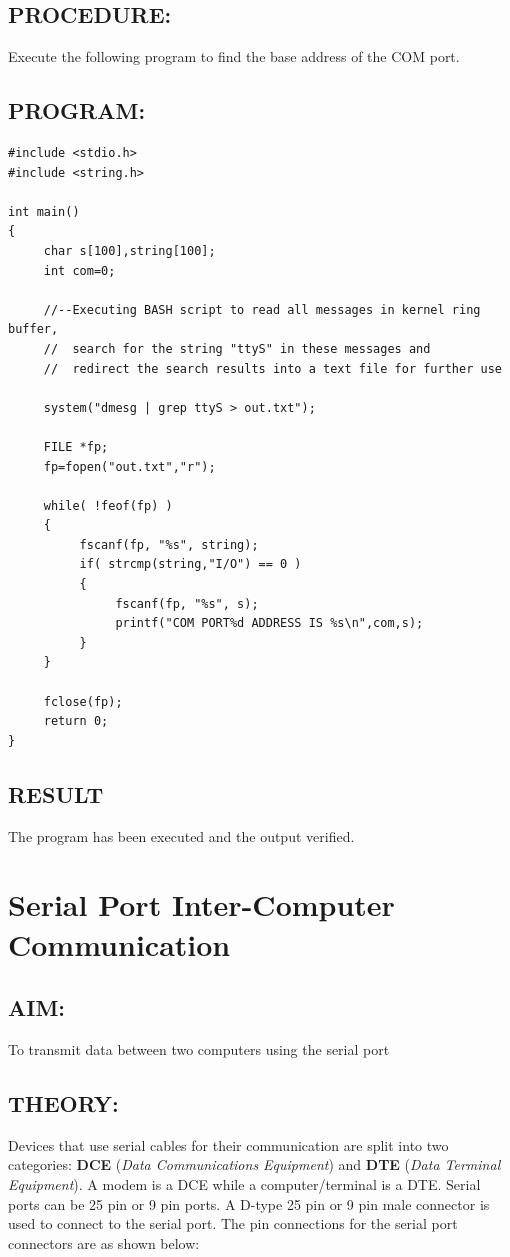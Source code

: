 \documentclass[a4paper,28pt,twoside,openright]{report}
\begin{document}
\section*{PROCEDURE:}
Execute the following program to find the base address of the COM port.

\section*{PROGRAM:}
\begin{lstlisting}
#include <stdio.h>
#include <string.h>

int main()
{
     char s[100],string[100];
     int com=0;
     
     //--Executing BASH script to read all messages in kernel ring buffer,
     //  search for the string "ttyS" in these messages and
     //  redirect the search results into a text file for further use
     
     system("dmesg | grep ttyS > out.txt");
     
     FILE *fp;
     fp=fopen("out.txt","r");
     
     while( !feof(fp) )
     {
          fscanf(fp, "%s", string);
          if( strcmp(string,"I/O") == 0 )
          {
               fscanf(fp, "%s", s);
               printf("COM PORT%d ADDRESS IS %s\n",com,s);
          }
     }
     
     fclose(fp);
     return 0;
}
\end{lstlisting}

\section*{RESULT}
The program has been executed and the output verified.
%
%
\chapter{Serial Port Inter-Computer Communication}
%
%
%
\section*{AIM:}To transmit data between two computers using the serial port

\section*{THEORY:}
Devices that use serial cables for their communication are split into two categories: \textbf{DCE} (\emph{Data Communications Equipment}) and \textbf{DTE} (\emph{Data Terminal Equipment}). A modem is a DCE while a computer/terminal is a DTE. Serial ports can be 25 pin or 9 pin ports. A D-type 25 pin or 9 pin male connector is used to connect to the serial port. The pin connections for the serial port connectors are as shown below:
\end{document}
